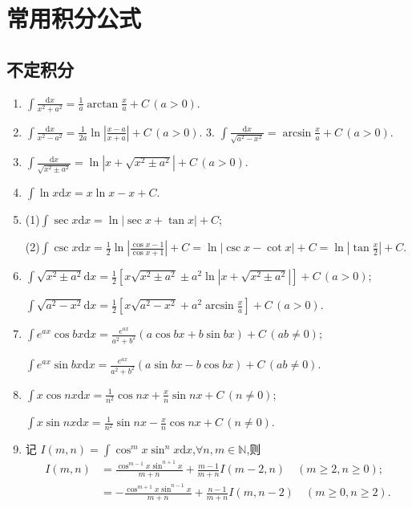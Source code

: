 \documentclass[../../main.tex]{subfiles}
\begin{document}
\section{常用积分公式}

\subsection{不定积分}

\begin{enumerate}
\item $\int\frac{\mathrm{d}x}{x^2+a^2}=\frac{1}{a}\arctan\frac{x}{a}+C\,(a>0)$.
\\
\item $\int\frac{\mathrm{d}x}{x^2-a^2}=\frac{1}{2a}\ln\left|\frac{x-a}{x+a}\right|+C\,(a>0)$.
3. $\int\frac{\mathrm{d}x}{\sqrt{a^2-x^2}}=\arcsin\frac{x}{a}+C\,(a>0)$.
\\
\item $\int\frac{\mathrm{d}x}{\sqrt{x^2\pm a^2}}=\ln\left|x+\sqrt{x^2\pm a^2}\right|+C\,(a>0)$.
\\
\item $\int\ln x\mathrm{d}x=x\ln x-x+C$.
\\
\item (1)$\int\sec x\mathrm{d}x=\ln|\sec x+\tan x|+C$;

(2)$\int\csc x\mathrm{d}x=\frac{1}{2}\ln \left| \frac{\cos x-1}{\cos x+1} \right|+C=\ln|\csc x-\cot x|+C=\ln|\tan \frac{x}{2}| + C.$
\\
\item $\int\sqrt{x^2\pm a^2}\mathrm{d}x=\frac{1}{2}\left[x\sqrt{x^2\pm a^2}\pm a^2\ln\left|x+\sqrt{x^2\pm a^2}\right|\right]+C\,(a>0)$;

$\int\sqrt{a^2-x^2}\mathrm{d}x=\frac{1}{2}\left[x\sqrt{a^2-x^2}+a^2\arcsin\frac{x}{a}\right]+C\,(a>0)$.
\\
\item $\int e^{ax}\cos bx\mathrm{d}x=\frac{e^{ax}}{a^2+b^2}(a\cos bx+b\sin bx)+C\,(ab\neq0)$;

$\int e^{ax}\sin bx\mathrm{d}x=\frac{e^{ax}}{a^2+b^2}(a\sin bx-b\cos bx)+C\,(ab\neq0)$.
\\
\item $\int x\cos nx\mathrm{d}x=\frac{1}{n^2}\cos nx+\frac{x}{n}\sin nx+C\,(n\neq0)$;

$\int x\sin nx\mathrm{d}x=\frac{1}{n^2}\sin nx-\frac{x}{n}\cos nx+C\,(n\neq0)$.
\\
\item 记 $I(m,n)=\int\cos^m x\sin^n x\mathrm{d}x$,$\forall n,m\in\mathbb{N}$,则
\begin{align*}
I(m,n)&=\frac{\cos^{m-1}x\sin^{n+1}x}{m+n}+\frac{m-1}{m+n}I(m-2,n)\quad(m\geqslant 2,n\geqslant 0);\\
&=-\frac{\cos^{m+1}x\sin^{n-1}x}{m+n}+\frac{n-1}{m+n}I(m,n-2)\quad(m\geqslant 0,n\geqslant 2).
\end{align*}
\end{enumerate}
\end{document}
